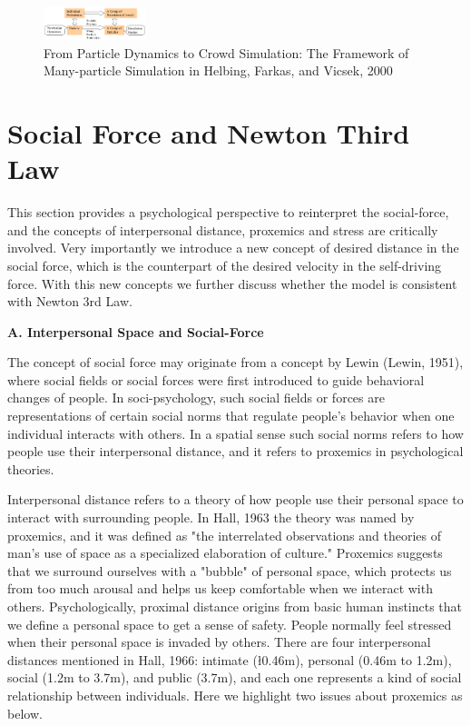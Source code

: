 \documentclass{article}
\begin{document}
%
\begin{figure}[tb]
  \centerline{\includegraphics[clip=true, width=30mm, scale=0.3]{FIGURES/helbingFramework.png}}
  \caption{From Particle Dynamics to Crowd Simulation: The Framework of Many-particle Simulation in Helbing, Farkas, and Vicsek, 2000}\label{Fig_helbingFramework}
\end{figure}
%

	
\section{Social Force and Newton Third Law}

This section provides a psychological perspective to reinterpret the social-force, and the concepts of interpersonal distance, proxemics and stress are critically involved.  Very importantly we introduce a new concept of desired distance in the social force, which is the counterpart of the desired velocity in the self-driving force.  With this new concepts we further discuss whether the model is consistent with Newton 3rd Law.


\noindent \textbf{ A. Interpersonal Space and Social-Force}

The concept of social force may originate from a concept by Lewin (Lewin, 1951), where social fields or social forces were first introduced to guide behavioral changes of people.  In soci-psychology, such social fields or forces are representations of certain social norms that regulate people's behavior when one individual interacts with others.  In a spatial sense such social norms refers to how people use their interpersonal distance, and it refers to proxemics in psychological theories.

Interpersonal distance refers to a theory of how people use their personal space to interact with surrounding people.  In Hall, 1963 the theory was named by proxemics, and it was defined as "the interrelated observations and theories of man's use of space as a specialized elaboration of culture."  Proxemics suggests that we surround ourselves with a "bubble" of personal space, which protects us from too much arousal and helps us keep comfortable when we interact with others.  Psychologically, proximal distance origins from basic human instincts that we define a personal space to get a sense of safety.  People normally feel stressed when their personal space is invaded by others.  There are four interpersonal distances mentioned in Hall, 1966: intimate (\l 0.46m), personal (0.46m to 1.2m), social (1.2m to 3.7m), and public (\g 3.7m), and each one represents a kind of social relationship between individuals.  Here we highlight two issues about proxemics as below.
\end{document}

